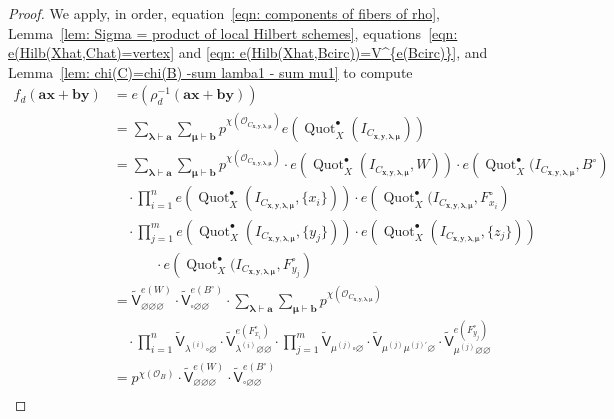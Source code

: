 \documentclass[12pt]{amsart}
\theoremstyle{definition}
\renewcommand{\O}{\mathcal{O}}
\newcommand{\sfVtilde}{\widetilde{\mathsf{V}}}
\newcommand{\Quot}{\operatorname{Quot}}
\newcommand{\boldx}{\boldsymbol{x}}
\newcommand{\boldy}{\boldsymbol{y}}
\newcommand{\bolda}{\boldsymbol{a}}
\newcommand{\boldb}{\boldsymbol{b}}
\newcommand{\boldlambda}{\boldsymbol{\lambda }}
\newcommand{\boldmu}{\boldsymbol{\mu }}
\renewcommand{\emptyset}{\varnothing}
\newcommand{\bx}{\square}
\newcommand{\mujprime}{\mu^{(j)\prime}}
\begin{document}
\begin{proof}
We apply, in order, equation~\eqref{eqn: components of fibers of rho},
Lemma~\ref{lem: Sigma = product of local Hilbert schemes},
equations~\eqref{eqn: e(Hilb(Xhat,Chat)=vertex} and \eqref{eqn:
e(Hilb(Xhat,Bcirc))=V^{e(Bcirc)}}, and Lemma~\ref{lem: chi(C)=chi(B)
-sum lamba1 - sum mu1} to compute
\begin{align*}
f_{d}(\bolda \boldx +\boldb \boldy )&= e\left(\rho_{d}^{-1}(\bolda
\boldx +\boldb \boldy) \right) \\
&= \sum_{\boldlambda \vdash \bolda}\sum_{\boldmu \vdash \boldb} p^{\chi (\O_{C_{\boldx, \boldy, \boldlambda, \boldmu}})} e\left(\Quot_X^{\bullet}(I_{C_{\boldx, \boldy, \boldlambda, \boldmu}}) \right)\\
&=\sum_{\boldlambda \vdash \bolda}\sum_{\boldmu
\vdash \boldb} p^{\chi (\O_{C_{\boldx, \boldy, \boldlambda, \boldmu}})} \cdot e(\Quot_X^{\bullet}(I_{C_{\boldx, \boldy, \boldlambda, \boldmu}}, W)) \cdot
e\left(\Quot_X^{\bullet}(I_{C_{\boldx, \boldy, \boldlambda, \boldmu}},B^{\circ} \right) \\
& \quad  \cdot \prod_{i=1}^{n}
e\left(\Quot_X^{\bullet}(I_{C_{\boldx, \boldy, \boldlambda, \boldmu}},\{x_{i}\}) \right) \cdot
e\left(\Quot_X^{\bullet}(I_{C_{\boldx, \boldy, \boldlambda, \boldmu}},F^{\circ}_{x_{i}}\right) \\
& \quad  \cdot   \prod_{j=1}^{m}
e\left(\Quot_X^{\bullet}(I_{C_{\boldx, \boldy, \boldlambda, \boldmu}},\{y_{j}\}) \right) \cdot
e\left(\Quot_X^{\bullet}(I_{C_{\boldx, \boldy, \boldlambda, \boldmu}},\{z_{j}\}) \right) \\
&\qquad \quad \cdot e\left(\Quot_X^{\bullet}(I_{C_{\boldx, \boldy, \boldlambda, \boldmu}},F^{\circ}_{y_{j}}
\right)\\
&=\sfVtilde_{\emptyset \emptyset
\emptyset}^{e(W)} \cdot \sfVtilde^{e(B^{\circ})}_{\bx \emptyset
\emptyset} \cdot  \sum_{\boldlambda \vdash \bolda}\sum_{\boldmu
\vdash \boldb} p^{\chi (\O_{C_{\boldx, \boldy, \boldlambda, \boldmu}})} \\
& \quad \cdot \prod_{i=1}^{n} \sfVtilde_{\lambda^{(i)}\bx \emptyset}
\cdot \sfVtilde^{e(F^{\circ}_{x_{i}})}_{\lambda^{(i)}\emptyset
\emptyset} \cdot \prod_{j=1}^{m} \sfVtilde_{\mu^{(j)}\bx \emptyset}
\cdot \sfVtilde_{\mu^{(j)} \mujprime \emptyset }\cdot
\sfVtilde^{e(F^{\circ}_{y_{j}})}_{\mu^{(j)}\emptyset \emptyset} \\
&=p^{\chi (\O_{B})}\cdot \sfVtilde_{\emptyset \emptyset
\emptyset}^{e(W)} \cdot \sfVtilde^{e(B^{\circ})}_{\bx \emptyset
\emptyset}\\

\end{align*}
\end{proof}
\end{document}
